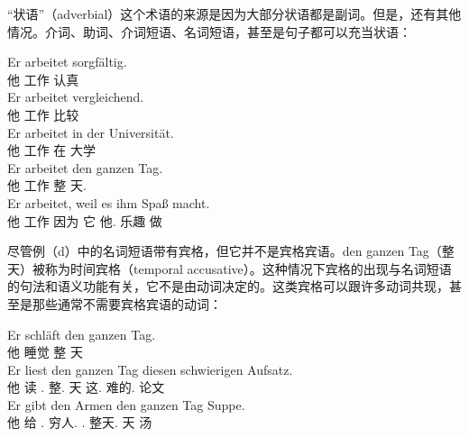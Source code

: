 “状语”（adverbial）这个术语的来源是因为大部分状语都是副词。但是，还有其他情况。介词、助词、介词短语、名词短语，甚至是句子都可以充当状语：

\eal
\ex 
\gll Er arbeitet sorgfältig.\\
	 他 工作 认真\\
\ex 
\gll Er arbeitet vergleichend.\\
	 他 工作 比较\\
\ex 
\gll Er arbeitet in der Universität.\\
	 他 工作 在  大学\\
\ex 
\gll Er arbeitet den ganzen Tag.\\
     他 工作  整 天.\acc\\
\ex 
\gll Er arbeitet, weil es ihm Spaß macht.\\
	 他 工作 因为 它 他.\dat{} 乐趣 做\\
\zl

\noindent
尽管例（d）中的名词短语带有宾格，但它并不是宾格宾语。den ganzen Tag（整天）被称为时间宾格（temporal accusative）。这种情况下宾格的出现与名词短语的句法和语义功能有关，它不是由动词决定的。这类宾格可以跟许多动词共现，甚至是那些通常不需要宾格宾语的动词：

\eal
\ex 
\gll Er schläft den ganzen Tag.\\
     他 睡觉  整 天\\
\ex 
\gll Er liest den ganzen Tag diesen schwierigen Aufsatz.\\
	 他 读 .\acc{} 整.\acc{} 天 这.\acc{} 难的.\acc{} 论文\\
\ex 
\gll Er gibt den Armen den ganzen Tag Suppe.\\
	 他 给 .\dat{} 穷人.\dat{} .\acc{} 整天.\acc{} 天 汤\\
\zl


